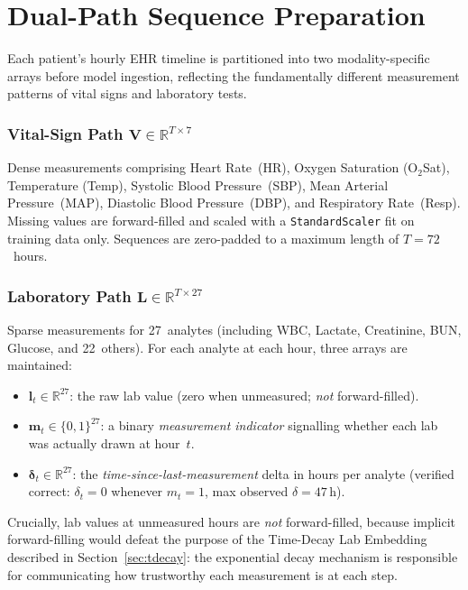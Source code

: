 \documentclass[conference,12pt]{IEEEtran}
\newcommand{\sect}[1]{Section~\ref{#1}}
\begin{document}
\section{\textbf{Dual-Path Sequence Preparation}}
\label{sec:prep}

Each patient's hourly EHR timeline is partitioned into two modality-specific
arrays before model ingestion, reflecting the fundamentally different measurement
patterns of vital signs and laboratory tests.

\subsubsection*{Vital-Sign Path $\mathbf{V} \in \mathbb{R}^{T \times 7}$}
Dense measurements comprising Heart Rate~(HR), Oxygen Saturation
(O$_2$Sat), Temperature (Temp), Systolic Blood Pressure~(SBP), Mean Arterial
Pressure~(MAP), Diastolic Blood Pressure~(DBP), and Respiratory Rate~(Resp).
Missing values are forward-filled and scaled with a \texttt{StandardScaler}
fit on training data only.
Sequences are zero-padded to a maximum length of $T = 72$~hours.

\subsubsection*{Laboratory Path $\mathbf{L} \in \mathbb{R}^{T \times 27}$}
Sparse measurements for 27~analytes (including WBC, Lactate, Creatinine, BUN,
Glucose, and 22~others).
For each analyte at each hour, three arrays are maintained:
\begin{itemize}
  \item $\mathbf{l}_t \in \mathbb{R}^{27}$: the raw lab value
        (zero when unmeasured; \emph{not} forward-filled).
  \item $\mathbf{m}_t \in \{0,1\}^{27}$: a binary
        \emph{measurement indicator} signalling whether each lab was actually
        drawn at hour~$t$.
  \item $\boldsymbol{\delta}_t \in \mathbb{R}^{27}$: the
        \emph{time-since-last-measurement} delta in hours per analyte
        (verified correct: $\delta_t = 0$ whenever $m_t = 1$, max
        observed $\delta = 47$\,h).
\end{itemize}

Crucially, lab values at unmeasured hours are \emph{not} forward-filled, because
implicit forward-filling would defeat the purpose of the Time-Decay Lab
Embedding described in \sect{sec:tdecay}: the exponential decay mechanism is
responsible for communicating how trustworthy each measurement is at each step.
\end{document}
